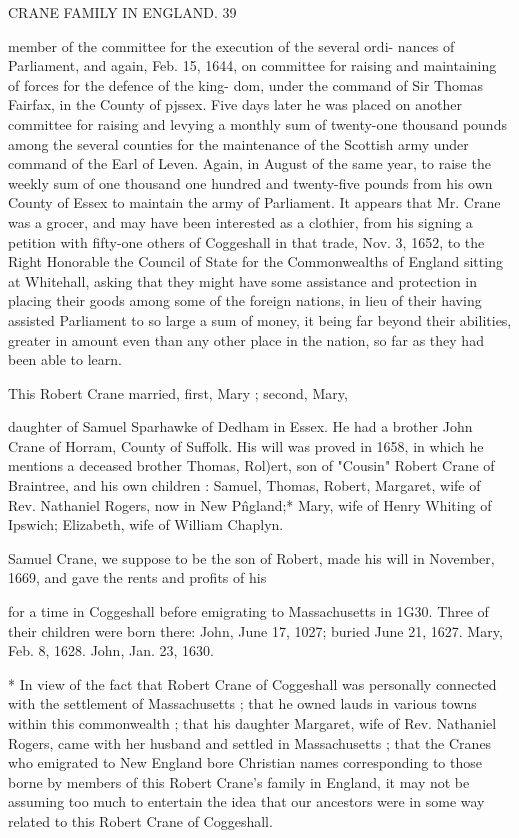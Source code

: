 \documentclass{book}
\begin{document}
CRANE FAMILY IN ENGLAND. 39 

member of the committee for the execution of the several ordi- 
nances of Parliament, and again, Feb. 15, 1644, on committee 
for raising and maintaining of forces for the defence of the king- 
dom, under the command of Sir Thomas Fairfax, in the County 
of pjssex. Five days later he was placed on another committee 
for raising and levying a monthly sum of twenty-one thousand 
pounds among the several counties for the maintenance of the 
Scottish army under command of the Earl of Leven. Again, in 
August of the same year, to raise the weekly sum of one thousand 
one hundred and twenty-five pounds from his own County of 
Essex to maintain the army of Parliament. It appears that Mr. 
Crane was a grocer, and may have been interested as a clothier, 
from his signing a petition with fifty-one others of Coggeshall in 
that trade, Nov. 3, 1652, to the Right Honorable the Council of 
State for the Commonwealths of England sitting at Whitehall, 
asking that they might have some assistance and protection in 
placing their goods among some of the foreign nations, in lieu of 
their having assisted Parliament to so large a sum of money, it 
being far beyond their abilities, greater in amount even than any 
other place in the nation, so far as they had been able to learn. 

This Robert Crane married, first, Mary ; second, Mary, 

daughter of Samuel Sparhawke of Dedham in Essex. He had a 
brother John Crane of Horram, County of Suffolk. His will was 
proved in 1658, in which he mentions a deceased brother Thomas, 
Rol)ert, son of "Cousin" Robert Crane of Braintree, and his own 
children : Samuel, Thomas, Robert, Margaret, wife of Rev. 
Nathaniel Rogers, now in New P\^ngland;* Mary, wife of Henry 
Whiting of Ipswich; Elizabeth, wife of William Chaplyn. 

Samuel Crane, we suppose to be the son of Robert, made his 
will in November, 1669, and gave the rents and profits of his 



for a time in Coggeshall before emigrating to Massachusetts in 1G30. 
Three of their children were born there: John, June 17, 1027; buried 
June 21, 1627. Mary, Feb. 8, 1628. John, Jan. 23, 1630. 

* In view of the fact that Robert Crane of Coggeshall was personally 
connected with the settlement of Massachusetts ; that he owned lauds in 
various towns within this commonwealth ; that his daughter Margaret, 
wife of Rev. Nathaniel Rogers, came with her husband and settled in 
Massachusetts ; that the Cranes who emigrated to New England bore 
Christian names corresponding to those borne by members of this 
Robert Crane's family in England, it may not be assuming too much to 
entertain the idea that our ancestors were in some way related to this 
Robert Crane of Coggeshall. 
\end{document}
